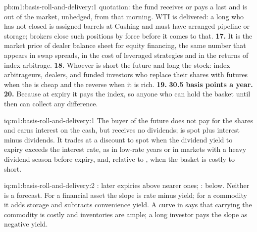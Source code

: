 \begin{solution}{pb:m1:basis-roll-and-delivery:1}
quotation: the fund receives or pays a last  and is out of
the market, unhedged, from that morning. WTI is delivered: a long who has not
closed is assigned barrels at Cushing and must have arranged pipeline or
storage; brokers close such positions by force before it comes to that.
\textbf{17.} It is the market price of dealer balance sheet for equity
financing, the same number that appears in swap spreads, in the cost of
leveraged strategies and in the returns of index arbitrage.
\textbf{18.} Whoever is short the future and long the stock: index
arbitrageurs, dealers, and funded investors who replace their shares with
futures when the  is cheap and the reverse when it is rich.
\textbf{19.} \textbf{30.5 basis points a year.}
\textbf{20.} Because at expiry it pays the index, so anyone who can hold the
basket until then can collect any difference.
\end{solution}

\begin{solution}{iq:m1:basis-roll-and-delivery:1}
The buyer of the future does not pay for the shares and earns interest on
the cash, but receives no dividends;  is spot plus interest minus
dividends. It trades at a discount to spot when the dividend yield to expiry
exceeds the interest rate, as in low-rate years or in markets with a heavy
dividend season before expiry, and, relative to , when the basket
is costly to short.
\end{solution}

\begin{solution}{iq:m1:basis-roll-and-delivery:2}
: later expiries above nearer ones; : below. Neither
is a forecast. For a financial asset the slope is rate minus yield; for a
commodity it adds storage and subtracts convenience yield. A curve in
 says that carrying the commodity is costly and inventories are
ample; a long investor pays the slope as negative  yield.
\end{solution}

